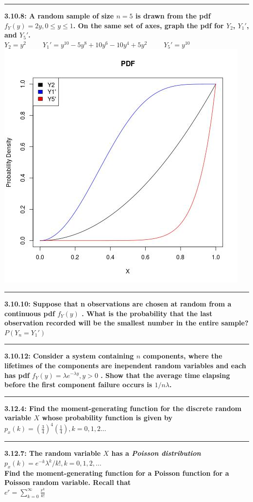 \documentclass[11pt]{article}
\newcommand\question[2]{\vspace{.25in}\hrule\textbf{#1: #2}\vspace{.5em}\vspace{.10in}}
\begin{document}
\question{3.10.8}
{A random sample of size $n = 5$ is drawn from the pdf
$f_{Y}(y) = 2y, 0 \leq y \leq 1$.
On the same set of axes, graph the pdf for
$Y_{2}$, $Y_{1}'$, and $Y_{5}'$.}
\\
$
Y_{2} = y^{2}
\ \ \ \ \ \ \ \ \ \ \ 
Y_{1}' = y^{10} - 5y^{8} + 10y^{6} - 10y^{4} + 5y^{2}
\ \ \ \ \ \ \ \ \ \ \ 
Y_{5}' = y^{10}
$
\includegraphics[scale=0.5]{rplot}


\question{3.10.10}
{Suppose that n observations are chosen at random from a continuous pdf
$f_{Y}(y)$
. What is the probability that the last observation recorded will be the smallest
number in the entire sample?}
\\
$
P(Y_{n} = Y_{1}')
$


\question{3.10.12}
{Consider a system containing $n$ components, where the lifetimes of the 
components are inependent random variables and each has pdf
$f_{Y}(y) = \lambda e^{- \lambda y}, y > 0$
. Show that the average time elapsing before the first component failure occurs
is $1/n \lambda $.}


\question{3.12.4}
{Find the moment-generating function for the discrete random variable $X$
whose probability function is given by
$p_{x}(k) = (\frac{3}{4})^{4}(\frac{1}{4}), k = 0,1,2...$}


\question{3.12.7}
{The random variable $X$ has a \emph{Poisson distribution}
$p_{x}(k) = e^{-k}\lambda ^{k}/k!, k=0,1,2,...$
\\
Find the moment-generating function for a Poisson function for a Poisson
random variable. Recall that
\\
$e^{r}=\sum_{k=0}^{\infty}\frac{r^{k}}{k!}$}
\end{document}
